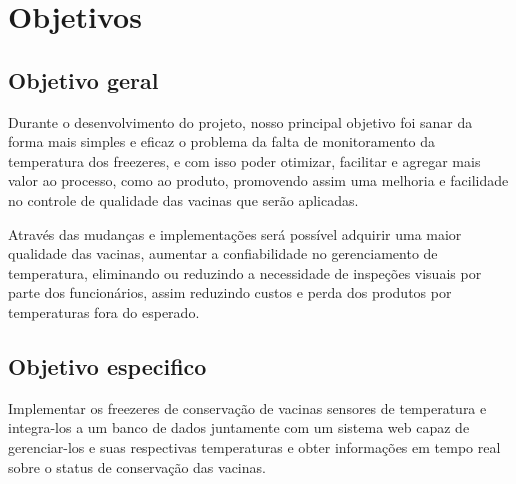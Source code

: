 \documentclass[hidelinks, 12pt, a4paper, brazil, oneside]{abntex2}
\begin{document}

\chapter{Objetivos}

    \section{Objetivo geral}

    Durante o desenvolvimento do projeto, 
    nosso principal objetivo
    foi sanar da forma mais simples e eficaz 
    o problema da falta de monitoramento da 
    temperatura dos freezeres, e com isso poder 
    otimizar, facilitar e agregar mais valor 
    ao processo, como ao produto, 
    promovendo assim uma melhoria e facilidade 
    no controle de qualidade das vacinas que serão
    aplicadas.

    Através das mudanças e implementações 
    será possível adquirir uma maior qualidade das 
    vacinas, aumentar a confiabilidade no 
    gerenciamento de temperatura, eliminando
    ou reduzindo a necessidade de inspeções visuais 
    por parte dos funcionários, assim reduzindo 
    custos e perda dos produtos por temperaturas
    fora do esperado.


    \section{Objetivo especifico}
    Implementar os freezeres de conservação de vacinas 
    sensores de temperatura e integra-los a um banco de 
    dados juntamente com um sistema web capaz de gerenciar-los
    e suas respectivas temperaturas e 
    obter informações em tempo real sobre o status 
    de conservação das vacinas.
\end{document}
